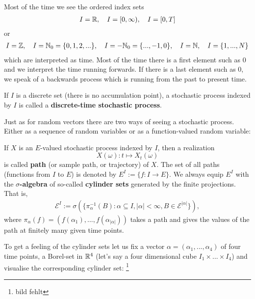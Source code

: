 Most of the time we see the ordered index sets 
\begin{align*}
	I=\mathbb{R}, \quad I=[0,\infty), \quad I=[0,T]
\end{align*}
or
\begin{align*}
	I=\mathbb{Z},\quad  I=\mathbb{N}_0=\lbrace 0,1,2,...\rbrace, \quad I=-\mathbb{N}_0=\{...,-1,0\}, \quad I=\mathbb{N}, \quad I=\{1,...,N\}
\end{align*}	 
	  which are interpreted as time. Most of the time there is a first element such as $0$ and we interpret the time running forwards. If there is a last element such as $0$, we speak of a backwards process which is running from the past to present time.
\begin{ldef}
\begin{deff}
	If $I$ is a discrete set (there is no accumulation point), a stochastic process indexed by $I$ is called a \textbf{discrete-time stochastic process}.
\end{deff}
\end{ldef}
Just as for random vectors there are two ways of seeing a stochastic process. Either as a sequence of random variables or as a function-valued random variable:
\begin{ldef}
\begin{deff}
	If $X$ is an $E$-valued stochastic process indexed by $I$, then a realization $$X(\omega):t\mapsto X_t(\omega)$$ is called \textbf{path} (or sample path, or trajectory) of $X$. The set of all paths (functions from $I$ to $E$) is denoted by $E^I:=\{f:I\to E\}.$
	We always equip $E^I$ with the \textbf{$\sigma$-algebra} of so-called \textbf{cylinder sets} generated by the finite projections. That is,
	\begin{align*}
		\mathcal E^I:= \sigma( \{\pi_\alpha^{-1}(B):\alpha \subseteq I, |\alpha|<\infty, B\in  \mathcal E^{|\alpha|}\}),
	\end{align*}
	where $\pi_\alpha(f)=(f(\alpha_1),...,f(\alpha_{|\alpha|}))$ takes a path and gives the values of the path at finitely many given time points. 
\end{deff}
\end{ldef}
To get a feeling of the cylinder sets let us fix a vector $\alpha=(\alpha_1,..., \alpha_4)$ of four time points, a Borel-set in $\mathbb{R}^4$ (let's say a four dimensional cube $I_1\times ... \times I_4$) and visualise the corresponding cylinder set: \footnote{bild fehlt}



